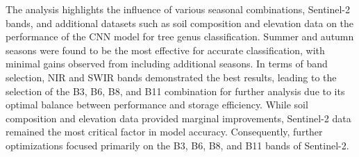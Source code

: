 The analysis highlights the influence of various seasonal combinations, Sentinel-2 bands, and additional datasets such as soil composition and elevation data on the performance of the CNN model for tree genus classification. Summer and autumn seasons were found to be the most effective for accurate classification, with minimal gains observed from including additional seasons. In terms of band selection, NIR and SWIR bands demonstrated the best results, leading to the selection of the B3, B6, B8, and B11 combination for further analysis due to its optimal balance between performance and storage efficiency. While soil composition and elevation data provided marginal improvements, Sentinel-2 data remained the most critical factor in model accuracy. Consequently, further optimizations focused primarily on the B3, B6, B8, and B11 bands of Sentinel-2.